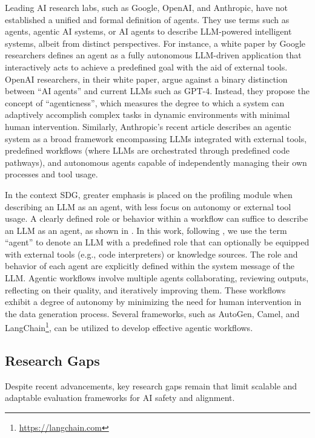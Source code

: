 \documentclass[12pt,a4paper]{article}
\newcommand{\qq}[1]{``#1''}  %
\begin{document}
Leading AI research labs, such as Google, OpenAI, and Anthropic, have not established a unified and formal definition of agents. They use terms such as agents, agentic AI systems, or AI agents to describe LLM-powered intelligent systems, albeit from distinct perspectives. For instance, a white paper by Google researchers defines an agent as a fully autonomous LLM-driven application that interactively acts to achieve a predefined goal with the aid of external tools\cite{agents-r4}. OpenAI researchers, in their white paper, argue against a binary distinction between \qq{AI agents} and current LLMs such as GPT-4. Instead, they propose the concept of \qq{agenticness}, which measures the degree to which a system can adaptively accomplish complex tasks in dynamic environments with minimal human intervention\cite{agents-r5}. Similarly, Anthropic's recent article describes an agentic system as a broad framework encompassing LLMs integrated with external tools, predefined workflows (where LLMs are orchestrated through predefined code pathways), and autonomous agents capable of independently managing their own processes and tool usage\cite{agents-r9}.

In the context SDG, greater emphasis is placed on the profiling module when describing an LLM as an agent, with less focus on autonomy or external tool usage. A clearly defined role or behavior within a workflow can suffice to describe an LLM as an agent, as shown in \cite{r90,r12,r13}. In this work, following \cite{r4}, we use the term \qq{agent} to denote an LLM with a predefined role that can optionally be equipped with external tools (e.g., code interpreters) or knowledge sources. The role and behavior of each agent are explicitly defined within the system message of the LLM. Agentic workflows involve multiple agents collaborating, reviewing outputs, reflecting on their quality, and iteratively improving them. These workflows exhibit a degree of autonomy by minimizing the need for human intervention in the data generation process. Several frameworks, such as AutoGen\cite{agents-r7}, Camel\cite{agents-camel}, and LangChain\footnote{\url{https://langchain.com}}, can be utilized to develop effective agentic workflows.




\subsection{Research Gaps}
Despite recent advancements, key research gaps remain that limit scalable and adaptable evaluation frameworks for AI safety and alignment.
\end{document}
